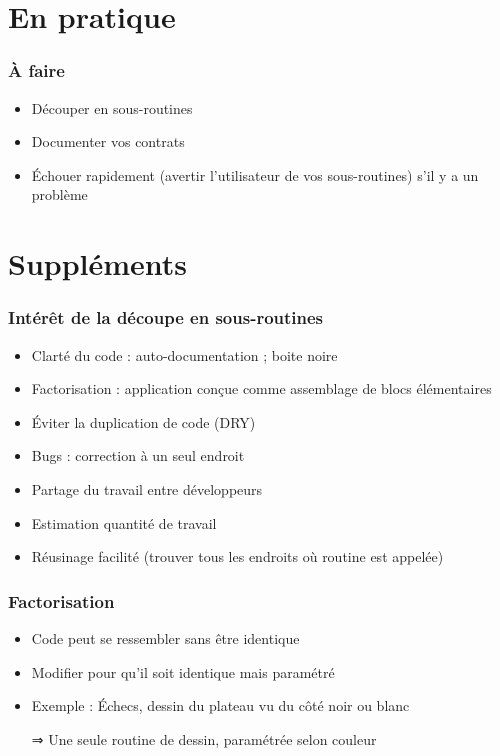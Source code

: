 \documentclass[english, french]{beamer}
\begin{document}
\section{En pratique}
\begin{frame}
	\frametitle{À faire}
	\begin{itemize}
		\item Découper en sous-routines
		\item Documenter vos contrats
		\item Échouer rapidement (avertir l’utilisateur de vos sous-routines) s’il y a un problème
	\end{itemize}
\end{frame}

\appendix
\section{Suppléments}
\begin{frame}
	\frametitle{Intérêt de la découpe en sous-routines}
	\begin{itemize}
		\item Clarté du code : auto-documentation ; boite noire
		\item Factorisation : application conçue comme assemblage de blocs élémentaires
		\item Éviter la duplication de code (DRY)
		\item Bugs : correction à un seul endroit
		\item Partage du travail entre développeurs
		\item Estimation quantité de travail
		\item Réusinage facilité (trouver tous les endroits où routine est appelée)
	\end{itemize}
\end{frame}

\begin{frame}
	\frametitle{Factorisation}
	\begin{itemize}
		\item Code peut se ressembler sans être identique
		\item Modifier pour qu’il soit identique mais paramétré
		\item Exemple : Échecs, dessin du plateau vu du côté noir ou blanc
		\item[⇒] Une seule routine de dessin, paramétrée selon couleur
	\end{itemize}
\end{frame}
\end{document}
